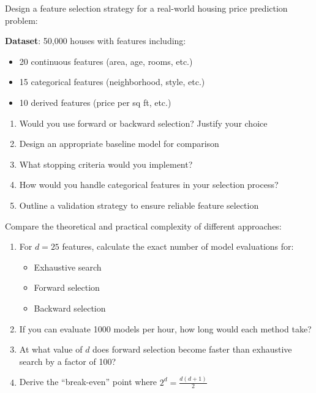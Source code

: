 \documentclass{article}
\newcounter{exercise}
\begin{document}
\begin{tcolorbox}[colback=blue!5!white,colframe=blue!75!black,title=\textbf{Exercise \theexercise: Real-World Application Design}]
Design a feature selection strategy for a real-world housing price prediction problem:

\textbf{Dataset}: 50,000 houses with features including:
\begin{itemize}
    \item 20 continuous features (area, age, rooms, etc.)
    \item 15 categorical features (neighborhood, style, etc.) 
    \item 10 derived features (price per sq ft, etc.)
\end{itemize}

\begin{enumerate}[label=(\alph*)]
    \item Would you use forward or backward selection? Justify your choice
    \item Design an appropriate baseline model for comparison
    \item What stopping criteria would you implement?
    \item How would you handle categorical features in your selection process?
    \item Outline a validation strategy to ensure reliable feature selection
\end{enumerate}
\end{tcolorbox}

\begin{tcolorbox}[colback=blue!5!white,colframe=blue!75!black,title=\textbf{Exercise \theexercise: Advanced Complexity Analysis}]
Compare the theoretical and practical complexity of different approaches:

\begin{enumerate}[label=(\alph*)]
    \item For $d = 25$ features, calculate the exact number of model evaluations for:
    \begin{itemize}
        \item Exhaustive search
        \item Forward selection  
        \item Backward selection
    \end{itemize}
    \item If you can evaluate 1000 models per hour, how long would each method take?
    \item At what value of $d$ does forward selection become faster than exhaustive search by a factor of 100?
    \item Derive the ``break-even'' point where $2^d = \frac{d(d+1)}{2}$
\end{enumerate}
\end{tcolorbox}
\end{document}
